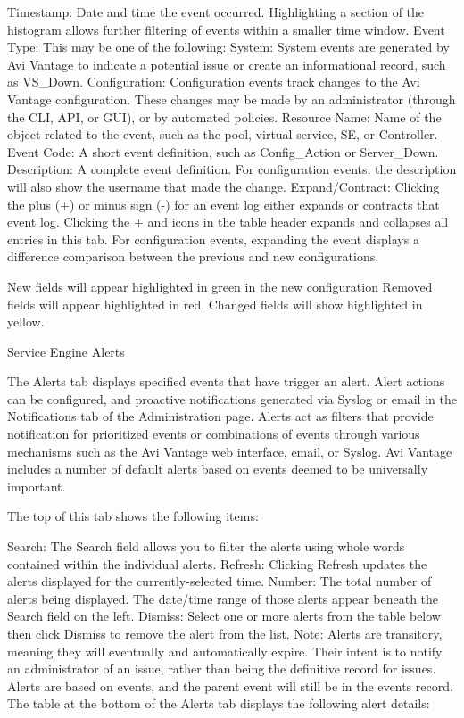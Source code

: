 \documentclass[letterpaper,10pt,english]{sphinxmanual}
\begin{document}
Timestamp: Date and time the event occurred. Highlighting a section of the histogram allows further filtering of events within a smaller time window.
Event Type: This may be one of the following:
System: System events are generated by Avi Vantage to indicate a potential issue or create an informational record, such as VS\_Down.
Configuration: Configuration events track changes to the Avi Vantage configuration. These changes may be made by an administrator (through the CLI, API, or GUI), or by automated policies.
Resource Name: Name of the object related to the event, such as the pool, virtual service, SE, or Controller.
Event Code: A short event definition, such as Config\_Action or Server\_Down.
Description: A complete event definition. For configuration events, the description will also show the username that made the change.
Expand/Contract: Clicking the plus (+) or minus sign (-) for an event log either expands or contracts that event log. Clicking the + and \textendash{} icons in the table header expands and collapses all entries in this tab.
For configuration events, expanding the event displays a difference comparison between the previous and new configurations.

New fields will appear highlighted in green in the new configuration
Removed fields will appear highlighted in red.
Changed fields will show highlighted in yellow.

Service Engine Alerts

The Alerts tab displays specified events that have trigger an alert. Alert actions can be configured, and proactive notifications generated via Syslog or email in the Notifications tab of the Administration page. Alerts act as filters that provide notification for prioritized events or combinations of events through various mechanisms such as the Avi Vantage web interface, email, or Syslog. Avi Vantage includes a number of default alerts based on events deemed to be universally important.

The top of this tab shows the following items:

Search: The Search field allows you to filter the alerts using whole words contained within the individual alerts.
Refresh: Clicking Refresh updates the alerts displayed for the currently-selected time.
Number: The total number of alerts being displayed. The date/time range of those alerts appear beneath the Search field on the left.
Dismiss: Select one or more alerts from the table below then click Dismiss to remove the alert from the list.
Note: Alerts are transitory, meaning they will eventually and automatically expire. Their intent is to notify an administrator of an issue, rather than being the definitive record for issues. Alerts are based on events, and the parent event will still be in the events record.
The table at the bottom of the Alerts tab displays the following alert details:
\end{document}

